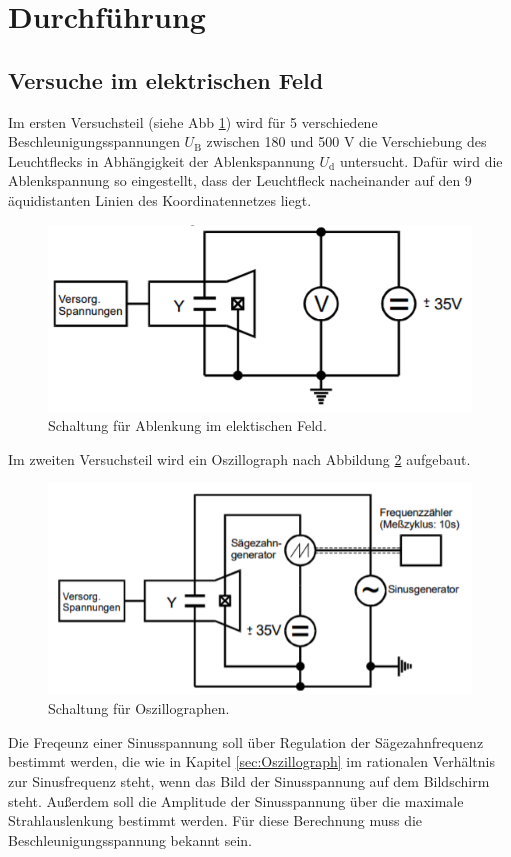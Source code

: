 \section{Durchführung}
\label{sec:Durchführung}

\subsection{Versuche im elektrischen Feld}

Im ersten Versuchsteil (siehe Abb \ref{fig:V1}) wird für 5 verschiedene Beschleunigungsspannungen $U_\text{B}$ zwischen 180 und 500 V die Verschiebung des Leuchtflecks in Abhängigkeit der Ablenkspannung $U_\text{d}$ untersucht.
Dafür wird die Ablenkspannung so eingestellt, dass der Leuchtfleck nacheinander auf den 9 äquidistanten Linien des Koordinatennetzes liegt.
\begin{figure}
  \centering
  \includegraphics{data/V1.png}
  \caption{Schaltung für Ablenkung im elektischen Feld.}
  \label{fig:V1}
\end{figure}

Im zweiten Versuchsteil wird ein Oszillograph nach Abbildung \ref{fig:V2} aufgebaut.
\begin{figure}
  \centering
  \includegraphics{data/V2.png}
  \caption{Schaltung für Oszillographen.}
  \label{fig:V2}
\end{figure}
Die Freqeunz einer Sinusspannung soll über Regulation der Sägezahnfrequenz bestimmt werden, die wie in Kapitel \ref{sec:Oszillograph} im rationalen Verhältnis zur Sinusfrequenz steht, wenn das Bild der Sinusspannung auf dem Bildschirm steht.
Außerdem soll die Amplitude der Sinusspannung über die maximale Strahlauslenkung bestimmt werden.
Für diese Berechnung muss die Beschleunigungsspannung bekannt sein.

